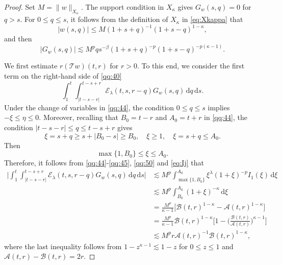 \documentclass[11pt,twoside]{article}
\newcommand{\f}{\frac}
\newcommand{\Acal}{\mathcal A}
\newcommand{\Bcal}{\mathcal B}
\newcommand{\dd}{\,\mathrm{d}}
\newcommand{\Ecal}{\mathcal E}
\newcommand{\Tcal}{\mathcal T}
\theoremstyle{plain}
\theoremstyle{definition}
\theoremstyle{remark}
\numberwithin{equation}{section}
\begin{document}
\begin{proof}
Set
$
M=\|w\|_{X_\kappa}.
$
The support condition in $X_\kappa$ gives $G_w(s,q)=0$ for $q>s$.
For $0\leq q\leq s$, it follows from the definition of $X_\kappa$ in \eqref{eq:Xkappa}
that
\begin{equation}
\label{qq:50'}
|w(s,q)|
\leq
M(1+s+q)^{-1}(1+s-q)^{1-\kappa},
\end{equation}
and then
\begin{equation}
\label{qq:50}
|G_w(s,q)|
\lesssim
M^p q s^{-\beta}
(1+s+q)^{-p}
(1+s-q)^{-p(\kappa-1)}.
\end{equation}

We first estimate $r(\Tcal w)(t,r)$ for $r>0$. To this end, we consider the first
term on the right-hand side of \eqref{qq:40}
\[
\int_1^t
\int_{|t-s-r|}^{t-s+r}
\Ecal_\lambda(t,s,r-q)
G_w(s,q)\dd q\dd s.
\]
Under the change of variables in \eqref{qq:44}, the condition
$0\leq q\leq s$ implies
$
-\xi\leq\eta\leq0.
$
Moreover, recalling that $B_0=t-r$ and $A_0=t+r$ in \eqref{qq:44},
the condition $|t-s-r|\leq q\leq t-s+r$ gives
\[
\xi=s+q
\geq
s+|B_0-s|
\geq
B_0,
\quad
\xi\geq1,
\quad
\xi=s+q\leq A_0.
\]
Then
\[
\max\{1,B_0\}\leq\xi\leq A_0.
\]
Therefore, it follows from \eqref{qq:44}-\eqref{qq:45}, \eqref{qq:50} and \eqref{eq:Ij} that
\begin{equation}\label{QQ-44}
\begin{aligned}
\big|
\int_1^t
\int_{|t-s-r|}^{t-s+r}
\Ecal_\lambda(t,s,r-q)
G_w(s,q)\dd q\dd s
\big|
&\lesssim
M^p
\int_{\max\{1,B_0\}}^{A_0}
\xi^\lambda(1+\xi)^{-p}
I_1(\xi)\dd\xi\\
&\lesssim
M^p
\int_{B_0}^{A_0}
(1+\xi)^{-\kappa}\dd\xi\\
&=
\f{M^p}{\kappa-1}
\big[
\Bcal(t,r)^{1-\kappa}
-
\Acal(t,r)^{1-\kappa}
\big]\\
&=\f{M^p}{\kappa-1}\Bcal(t,r)^{1-\kappa}
\big[
1-
\big(
\f{\Bcal(t,r)}{\Acal(t,r)}
\big)^{\kappa-1}
\big]\\
&\lesssim
M^p r
\Acal(t,r)^{-1}
\Bcal(t,r)^{1-\kappa},
\end{aligned}
\end{equation}
where the last inequality follows from
$1-z^{\kappa-1}\lesssim1-z$ for $0\leq z\leq1$ and
$\Acal(t,r)-\Bcal(t,r)=2r$.


\end{proof}
\end{document}

